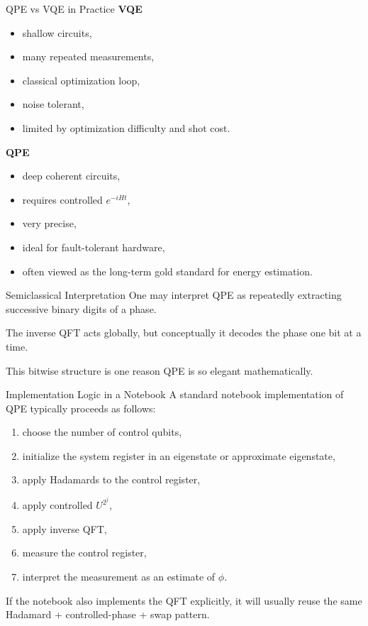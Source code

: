 \documentclass{beamer}
\begin{document}
\begin{frame}{QPE vs VQE in Practice}
\textbf{VQE}
\begin{itemize}
\item shallow circuits,
\item many repeated measurements,
\item classical optimization loop,
\item noise tolerant,
\item limited by optimization difficulty and shot cost.
\end{itemize}

\textbf{QPE}
\begin{itemize}
\item deep coherent circuits,
\item requires controlled \(e^{-iHt}\),
\item very precise,
\item ideal for fault-tolerant hardware,
\item often viewed as the long-term gold standard for energy estimation.
\end{itemize}
\end{frame}

\begin{frame}{Semiclassical Interpretation}
One may interpret QPE as repeatedly extracting successive binary digits of a phase.

The inverse QFT acts globally, but conceptually it decodes the phase one bit at a time.

This bitwise structure is one reason QPE is so elegant mathematically.
\end{frame}

\begin{frame}{Implementation Logic in a Notebook}
A standard notebook implementation of QPE typically proceeds as follows:
\begin{enumerate}
\item choose the number of control qubits,
\item initialize the system register in an eigenstate or approximate eigenstate,
\item apply Hadamards to the control register,
\item apply controlled \(U^{2^j}\),
\item apply inverse QFT,
\item measure the control register,
\item interpret the measurement as an estimate of \(\phi\).
\end{enumerate}

If the notebook also implements the QFT explicitly, it will usually reuse the same Hadamard + controlled-phase + swap pattern.
\end{frame}
\end{document}
